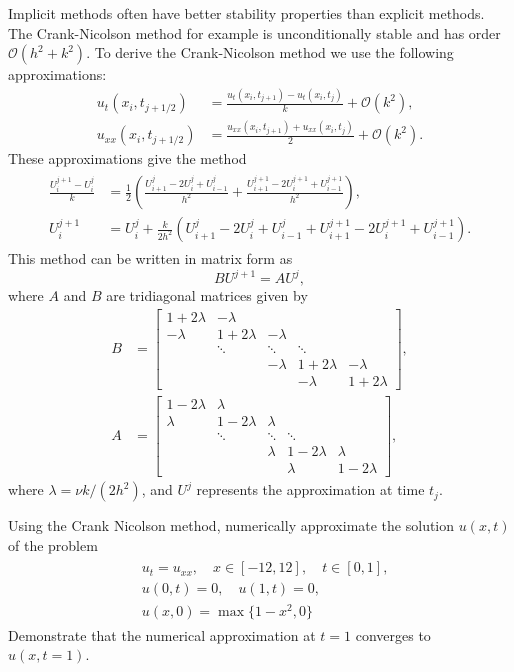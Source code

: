 Implicit methods often have better stability properties than explicit methods. The Crank-Nicolson method for example is unconditionally stable and has order $\mathcal{O}(h^2 + k^2)$. To derive the Crank-Nicolson method we use the following approximations: 
\begin{align*}
	u_t(x_i,t_{j+1/2}) &= \frac{u_t(x_i,t_{j+1}) - u_t(x_i,t_j)}{k} + \mathcal{O}(k^2), \\
	u_{xx}(x_i,t_{j+1/2}) &= \frac{u_{xx}(x_i,t_{j+1}) + u_{xx}(x_i,t_j)}{2} + \mathcal{O}(k^2).
\end{align*}
These approximations give the method 
\begin{align}
	\begin{split}
	\frac{U^{j+1}_i - U^j_i}{k} &= \frac{1}{2}\left( \frac{U^j_{i+1} - 2U^j_{i} + U^j_{i-1}}{h^2} + \frac{U^{j+1}_{i+1} - 2U^{j+1}_{i} + U^{j+1}_{i-1}}{h^2}  \right) ,\\
	U^{j+1}_i  &= U^j_i + \frac{k}{2h^2} \left( U^j_{i+1} - 2U^j_{i} + U^j_{i-1} + U^{j+1}_{i+1} - 2U^{j+1}_{i} + U^{j+1}_{i-1}   \right).
\end{split}
\end{align}
This method can be written in matrix form as 
\[
BU^{j+1} = A U^j ,
\]
where $A$ and $B$ are tridiagonal matrices given by 
\begin{align*}
B &= \left[\begin{array}{cccccc}1+2\lambda & -\lambda &  &  &  \\ -\lambda & 1+2\lambda &  -\lambda & &  \\ &  \ddots &   \ddots & \ddots \\ & &  -\lambda &  1+2\lambda & -\lambda \\ &  &  & -\lambda & 1+2\lambda\end{array}\right], \\
A &= \left[\begin{array}{cccccc}1-2\lambda & \lambda &  &  &  \\ \lambda & 1-2\lambda &  \lambda & &  \\ &  \ddots &   \ddots & \ddots \\ & &  \lambda &  1-2\lambda & \lambda \\ &  &  & \lambda & 1-2\lambda\end{array}\right], 
\end{align*}
where $\lambda = \nu k/(2h^2)$, 
and $U^j$ represents the approximation at time $t_j$.


\begin{problem}
	Using the Crank Nicolson method, numerically approximate the solution $u(x,t)$ of the problem 
	\begin{align}
		\begin{split}
		&{ } u_t = u_{xx}, \quad x \in [-12,12],\quad t \in [0,1], \\
		&{ } u(0,t) = 0,\quad u(1,t) = 0,\\
		&{ } u(x,0) = \max\{1 - x^2,0\}
		\end{split}\label{heat_exercise3}
	\end{align}
	Demonstrate that the numerical approximation at $t = 1$ converges to  $u(x,t=1)$.
\end{problem}

